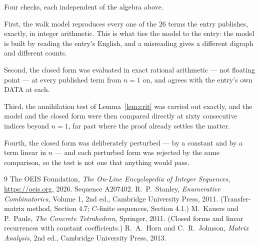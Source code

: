 \documentclass[11pt,a4paper]{article}
\theoremstyle{plain}
\theoremstyle{definition}
\begin{document}
Four checks, each independent of the algebra above.

First, the walk model reproduces every one of the $26$ terms the entry publishes,
exactly, in integer arithmetic. This is what ties the model to the entry: the model is built
by reading the entry's English, and a misreading gives a different digraph and different
counts.

Second, the closed form was evaluated in exact rational arithmetic --- not floating point ---
at every published term from $n=1$ on, and agrees with the entry's own DATA at each.

Third, the annihilation test of Lemma~\ref{lem:crit} was carried out exactly, and the model
and the closed form were then compared directly at sixty consecutive indices beyond
$n=1$, far past where the proof already settles the matter.

Fourth, the closed form was deliberately perturbed --- by a constant and by a term linear in
$n$ --- and each perturbed form was rejected by the same comparison, so the test is not one
that anything would pass.

\begin{thebibliography}{9}
 The OEIS Foundation, \emph{The On-Line Encyclopedia of Integer
Sequences}, \url{https://oeis.org}, 2026. Sequence A207402.
 R.~P.~Stanley, \emph{Enumerative Combinatorics}, Volume 1, 2nd ed.,
Cambridge University Press, 2011. (Transfer-matrix method, Section 4.7; $C$-finite sequences,
Section 4.1.)
 M.~Kauers and P.~Paule, \emph{The Concrete Tetrahedron}, Springer, 2011.
(Closed forms and linear recurrences with constant coefficients.)
 R.~A.~Horn and C.~R.~Johnson, \emph{Matrix Analysis}, 2nd ed., Cambridge
University Press, 2013.
\end{thebibliography}
\end{document}
